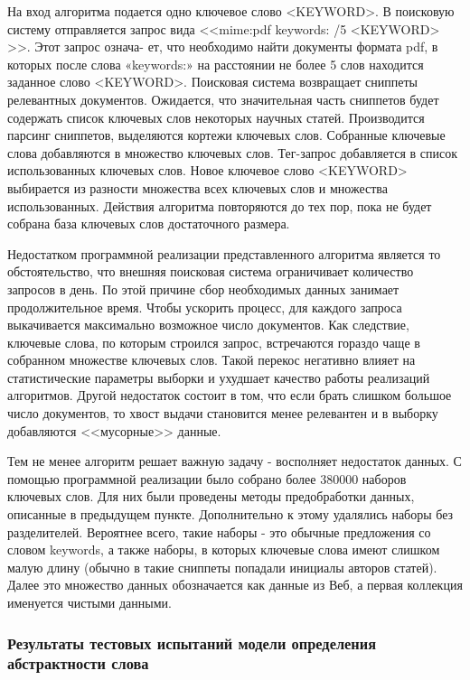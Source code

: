 На вход алгоритма подается одно ключевое слово <KEYWORD>. В поисковую систему отправляется запрос вида <<mime:pdf keywords: /5 <KEYWORD> >>. Этот запрос означа- ет, что необходимо найти документы формата pdf, в которых после слова «keywords:» на расстоянии не более 5 слов находится заданное слово <KEYWORD>. Поисковая система возвращает сниппеты релевантных документов. Ожидается, что значительная часть сниппетов будет содержать список ключевых слов некоторых научных статей. Производится парсинг сниппетов, выделяются кортежи ключевых слов. Собранные ключевые слова добавляются в множество ключевых слов. Тег-запрос добавляется в список использованных ключевых слов. Новое ключевое слово <KEYWORD> выбирается из разности множества всех ключевых слов и множества использованных. Действия алгоритма повторяются до тех пор, пока не будет собрана база ключевых слов достаточного размера.

Недостатком программной реализации представленного алгоритма является то обстоятельство, что внешняя поисковая система ограничивает количество запросов в день. По этой причине сбор необходимых данных занимает продолжительное время. Чтобы ускорить процесс, для каждого запроса выкачивается максимально возможное число документов. Как следствие, ключевые слова, по которым строился запрос, встречаются гораздо чаще в собранном множестве ключевых слов. Такой перекос негативно влияет на статистические параметры выборки и ухудшает качество работы реализаций алгоритмов. Другой недостаток состоит в том, что если брать слишком большое число документов, то хвост выдачи становится менее релевантен и в выборку добавляются <<мусорные>> данные.

Тем не менее алгоритм решает важную задачу - восполняет недостаток данных. С помощью программной реализации было собрано более 380000 наборов ключевых слов. Для них были проведены методы предобработки данных, описанные в предыдущем пункте. Дополнительно к этому удалялись наборы без разделителей. Вероятнее всего, такие наборы - это обычные предложения со словом keywords, а также наборы, в которых ключевые слова имеют слишком малую длину (обычно в такие сниппеты попадали инициалы авторов статей). Далее это множество данных обозначается как данные из Веб, а первая коллекция именуется чистыми данными.

\subsubsection{Результаты тестовых испытаний модели определения абстрактности слова}

